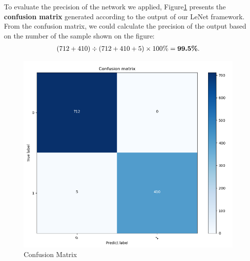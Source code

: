 \documentclass{mcmthesis}
\begin{document}
		\quad To evaluate the precision of the network we applied, Figure\ref{matrix} presents the \textbf{confusion matrix} generated according to the output of our LeNet framework. From the confusion matrix, we could calculate the precision of the output based on the number of the sample shown on the figure:
		\begin{align*}
			(712+410) \div (712+410+5) \times 100\% = \text{\textbf{99.5\%}}.
		\end{align*} 
	\begin{figure}[h]
   \centering
   \includegraphics[scale=0.45]{Matrix2.png}
   \caption{Confusion Matrix}
   \label{matrix}
  \end{figure}\\
\end{document}
